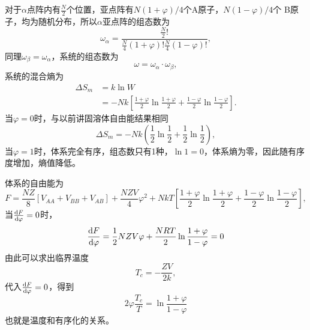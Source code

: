             对于$\alpha$点阵内有$\frac{N}{2}$个位置，亚点阵有$N(1+\varphi)/4$个A原子，$N(1-\varphi)/4$个
            B原子，均为随机分布，所以$\alpha$亚点阵的组态数为
            \begin{equation}
                \omega_\alpha=\frac{\frac{N}{2} !}{\frac{N}{4}(1+\varphi) ! \frac{N}{4}(1-\varphi) !},
            \end{equation}
            同理$\omega_\beta=\omega_\alpha$，系统的组态数为
            \begin{equation}
                \omega=\omega_\alpha\cdot\omega_\beta,
            \end{equation}
            系统的混合熵为
            \begin{equation}
                \begin{aligned}
                \Delta S_{m}&=k \ln W \\
                    &=-N k\left[\frac{1+\varphi}{2} \ln \frac{1+\varphi}{2}+\frac{1-\varphi}{2} \ln \frac{1-\varphi}{2}\right].
                \end{aligned}
            \end{equation}
            当$\varphi=0$时，与以前讲固溶体自由能结果相同
            \begin{equation}
                \Delta S_{m}=-Nk\left( \frac{1}{2}\ln\frac{1}{2}+\frac{1}{2}\ln\frac{1}{2} \right),
            \end{equation}
            当$\varphi=1$时，体系完全有序，组态数只有1种，$\ln1=0$，体系熵为零，因此随有序度增加，熵值降低。

            体系的自由能为
            \begin{equation}
                F=\frac{N Z}{8}\left[V_{A A}+V_{B B}+V_{A B}\right]+\frac{N Z V}{4} \varphi^{2}+N k T\left[\frac{1+\varphi}{2} \ln \frac{1+\varphi}{2}+\frac{1-\varphi}{2} \ln \frac{1-\varphi}{2}\right],
            \end{equation}
            当$\frac{\mathop{}\!\mathrm{d} F}{\mathop{}\!\mathrm{d} \varphi}=0$时，
            \begin{equation}
                \frac{\mathop{}\!\mathrm{d} F}{\mathop{}\!\mathrm{d} \varphi}=\frac{1}{2} N Z V \varphi+\frac{N R T}{2} \ln \frac{1+\varphi}{1-\varphi}=0
            \end{equation}
            由此可以求出临界温度
            \begin{equation}
                T_c=-\frac{ZV}{2k},
            \end{equation}
            代入$\frac{\mathop{}\!\mathrm{d} F}{\mathop{}\!\mathrm{d} \varphi}=0$，得到
            \begin{equation}
                2\varphi\frac{T_c}{T}=\ln\frac{1+\varphi}{1-\varphi}
            \end{equation}
            也就是温度和有序化的关系。
